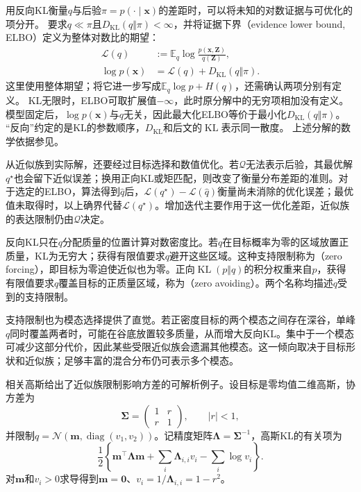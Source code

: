 用反向KL衡量$q$与后验$\pi=p(\cdot\mid\bm x)$的差距时，可以将未知的对数证据与可优化的项分开。
要求$q\ll\pi$且$D_{\mathrm{KL}}(q\Vert\pi)<\infty$，并将证据下界（evidence lower bound, ELBO）定义为整体对数比的期望：
\begin{equation}
  \begin{aligned}
    \mathcal L(q)
      &:=\mathbb E_q\log\frac{p(\bm x,\bm Z)}{q(\bm Z)},\\
    \log p(\bm{x})
      &=\mathcal L(q)+D_{\mathrm{KL}}(q\Vert\pi).
  \end{aligned}
  \label{eq:pgm-variational-elbo}
\end{equation}
这里使用整体期望；将它进一步写成$\mathbb E_q\log p+H(q)$，还需确认两项分别有定义。
KL无限时，ELBO可取扩展值$-\infty$，此时原分解中的无穷项相加没有定义。
模型固定后，$\log p(\bm x)$与$q$无关，因此最大化ELBO等价于最小化$D_{\mathrm{KL}}(q\Vert\pi)$。
“反向”约定的是KL的参数顺序，$D_{\mathrm{KL}}$和后文的$\operatorname{KL}$表示同一散度。
上述分解的数学依据参见。

从近似族到实际解，还要经过目标选择和数值优化。若$\mathcal Q$无法表示后验，其最优解$q^\star$也会留下近似误差；换用正向KL或矩匹配，则改变了衡量分布差距的准则。对于选定的ELBO，算法得到$\widehat q$后，$\mathcal L(q^\star)-\mathcal L(\widehat q)$衡量尚未消除的优化误差；最优值未取得时，以上确界代替$\mathcal L(q^\star)$。增加迭代主要作用于这一优化差距，近似族的表达限制仍由$\mathcal Q$决定。

反向KL只在$q$分配质量的位置计算对数密度比。若$q$在目标概率为零的区域放置正质量，KL为无穷大；获得有限值要求$q$避开这些区域。这种支持限制称为（zero forcing），即目标为零迫使近似也为零。正向$\operatorname{KL}(p\Vert q)$的积分权重来自$p$，获得有限值要求$q$覆盖目标的正质量区域，称为（zero avoiding）。两个名称均描述$q$受到的支持限制。

支持限制也为模态选择提供了直觉。若正密度目标的两个模态之间存在深谷，单峰$q$同时覆盖两者时，可能在谷底放置较多质量，从而增大反向KL。集中于一个模态可减少这部分代价，因此某些受限近似族会遗漏其他模态。这一倾向取决于目标形状和近似族；足够丰富的混合分布仍可表示多个模态。

相关高斯给出了近似族限制影响方差的可解析例子。设目标是零均值二维高斯，协方差为
\[
  \bm{\Sigma}=
  \begin{pmatrix}1&r\\r&1\end{pmatrix},
  \qquad |r|<1,
\]
并限制$q=\mathcal N(\bm{m},\operatorname{diag}(v_1,v_2))$。记精度矩阵$\bm{\Lambda}=\bm{\Sigma}^{-1}$，高斯KL的有关项为
\[
  \frac12\left\{\bm{m}^{\top}\bm{\Lambda}\bm{m}
     +\sum_i\bm{\Lambda}_{i,i}v_i-\sum_i\log v_i\right\}.
\]
对$\bm{m}$和$v_i>0$求导得到$\bm{m}=\bm{0}$、$v_i=1/\bm{\Lambda}_{i,i}=1-r^2$。

